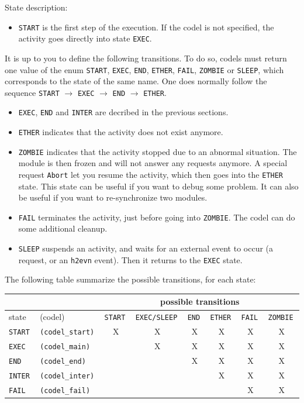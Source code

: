 \bigbreak

State description:

\begin{itemize}
\item \texttt{START} is the first step of the execution. If the codel is not
specified, the activity goes directly into state \texttt{EXEC}.
\end{itemize}

It is up  to you to define the   following transitions. To  do so, codels
must return one value of  the enum \texttt{START},  \texttt{EXEC}, \texttt{END},
\texttt{ETHER},  \texttt{FAIL}, \texttt{ZOMBIE} or \texttt{SLEEP}, which corresponds
to the state of the same name. One does normally follow the sequence 
\texttt{START} $\rightarrow$ \texttt{EXEC} $\rightarrow$  \texttt{END} $\rightarrow$
\texttt{ETHER}.

\begin{itemize}
\item \texttt{EXEC}, \texttt{END} and \texttt{INTER} are decribed in the previous
sections.

\item \texttt{ETHER} indicates that the activity does not exist anymore.

\item \texttt{ZOMBIE} indicates that the activity stopped due to an abnormal
situation. The module  is then  frozen and  will not answer  any requests
anymore. A special request \texttt{Abort} let you resume the activity, which
then  goes into the  \texttt{ETHER} state. This  state can  be useful if you
want  to debug  some problem.  It   can also be  useful   if you want  to
re-synchronize two modules.

\item \texttt{FAIL} terminates the activity, just before going into 
\texttt{ZOMBIE}. The codel can do some additional cleanup.

\item \texttt{SLEEP} suspends an activity, and waits for an external event
to occur (a request,  or an \texttt{h2evn} event). Then  it returns  to the
\texttt{EXEC} state.
\end{itemize}

The following table summarize the possible transitions, for each state:

\bigbreak

{\small\begin{tabular}{|ll||c|c|c|c|c|c|}
\cline{3-8}
\multicolumn{2}{c}{} & \multicolumn{6}{|c|}{possible transitions} \\
\hline
state & (codel) & \tt START & \tt EXEC/SLEEP & \tt END & \tt ETHER & \tt FAIL & \tt ZOMBIE \\
\hline
\tt START  & \tt (codel\_start)	& X & X & X & X & X & X \\
\tt EXEC   & \tt (codel\_main) 	&   & X & X & X & X & X \\
\tt END    & \tt (codel\_end) 	&   &   & X & X & X & X \\
\tt INTER  & \tt (codel\_inter) &   &   &   & X & X & X \\
\tt FAIL   & \tt (codel\_fail) 	&   &   &   &   & X & X \\
\hline
\end{tabular}}

